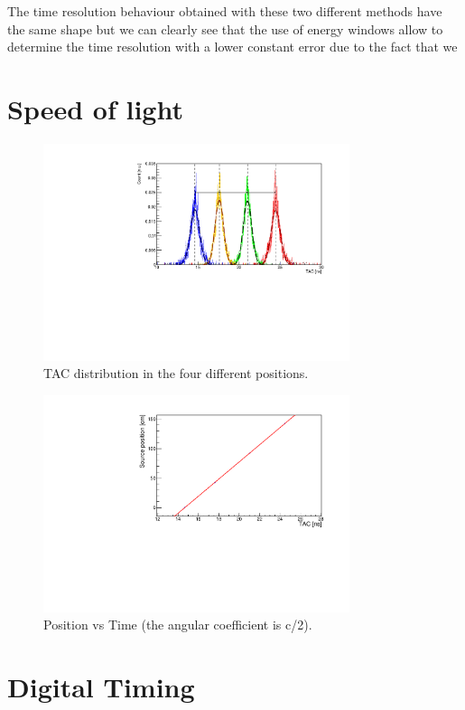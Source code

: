 \documentclass[a4paper,11pt]{article}
\begin{document}
\noindent The time resolution behaviour obtained with these two different methods have the same shape but we can clearly see that the use of energy windows allow to determine the time resolution with a lower constant error due to the fact that we 

\section*{Speed of light}
\lipsum[1]
\begin{figure}[h!]
\centering
\includegraphics[width=0.8\textwidth]{TACoverlayed_dist}
\caption{TAC distribution in the four different positions.}
\end{figure}
 
\begin{figure}[h!]
\centering
\includegraphics[width=0.8\textwidth]{Speed_fit}
\caption{Position vs Time (the angular coefficient is c/2).}
\end{figure}
\section*{Digital Timing}
\end{document}
